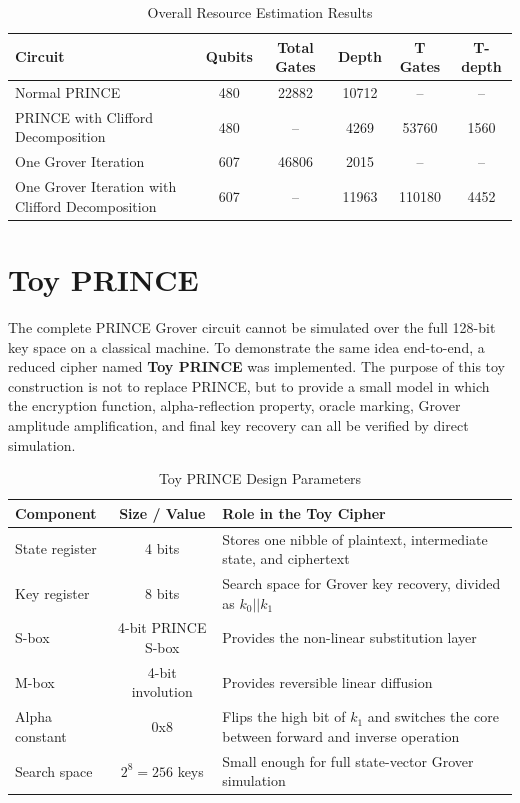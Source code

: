 \documentclass[12pt,a4paper]{report}
\begin{document}
\begin{table}[H]
\centering
\caption{Overall Resource Estimation Results}
\label{tab:overall_results}
\small
\begin{tabularx}{\textwidth}{|X|c|c|c|c|c|}
\hline
\textbf{Circuit} & \textbf{Qubits} & \textbf{Total Gates} & \textbf{Depth} & \textbf{T Gates} & \textbf{T-depth} \\
\hline
Normal PRINCE & 480 & 22882 & 10712 & -- & -- \\
\hline
PRINCE with Clifford Decomposition & 480 & -- & 4269 & 53760 & 1560 \\
\hline
One Grover Iteration & 607 & 46806 & 2015 & -- & -- \\
\hline
One Grover Iteration with Clifford Decomposition & 607 & -- & 11963 & 110180 & 4452 \\
\hline
\end{tabularx}
\end{table}
    

\chapter{Toy PRINCE}

The complete PRINCE Grover circuit cannot be simulated over the full 128-bit key space on a classical machine. To demonstrate the same idea end-to-end, a reduced cipher named \textbf{Toy PRINCE} was implemented. The purpose of this toy construction is not to replace PRINCE, but to provide a small model in which the encryption function, alpha-reflection property, oracle marking, Grover amplitude amplification, and final key recovery can all be verified by direct simulation.

\begin{table}[H]
\centering
\caption{Toy PRINCE Design Parameters}
\label{tab:toy_prince_parameters}
\begin{tabularx}{\textwidth}{|X|c|X|}
\hline
\textbf{Component} & \textbf{Size / Value} & \textbf{Role in the Toy Cipher} \\
\hline
State register & 4 bits & Stores one nibble of plaintext, intermediate state, and ciphertext \\
\hline
Key register & 8 bits & Search space for Grover key recovery, divided as $k_0 || k_1$ \\
\hline
S-box & 4-bit PRINCE S-box & Provides the non-linear substitution layer \\
\hline
M-box & 4-bit involution & Provides reversible linear diffusion \\
\hline
Alpha constant & 0x8 & Flips the high bit of $k_1$ and switches the core between forward and inverse operation \\
\hline
Search space & $2^8 = 256$ keys & Small enough for full state-vector Grover simulation \\
\hline
\end{tabularx}
\end{table}
\end{document}
